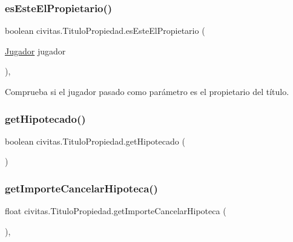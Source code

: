\subsubsection{\texorpdfstring{es\+Este\+El\+Propietario()}{esEsteElPropietario()}}
{\footnotesize\ttfamily boolean civitas.\+Titulo\+Propiedad.\+es\+Este\+El\+Propietario (\begin{DoxyParamCaption}\item[{\hyperlink{classcivitas_1_1Jugador}{Jugador}}]{jugador }\end{DoxyParamCaption})\hspace{0.3cm}{\ttfamily [inline]}, {\ttfamily [private]}}

Comprueba si el jugador pasado como parámetro es el propietario del título. \mbox{\label{classcivitas_1_1TituloPropiedad_a10cc16f629330f82d9fb844c2a1aeac5}} 
\subsubsection{\texorpdfstring{get\+Hipotecado()}{getHipotecado()}}
{\footnotesize\ttfamily boolean civitas.\+Titulo\+Propiedad.\+get\+Hipotecado (\begin{DoxyParamCaption}{ }\end{DoxyParamCaption})\hspace{0.3cm}{\ttfamily [inline]}}

\mbox{\label{classcivitas_1_1TituloPropiedad_a02c54372a15432b602c8a0bfee1a2876}} 
\subsubsection{\texorpdfstring{get\+Importe\+Cancelar\+Hipoteca()}{getImporteCancelarHipoteca()}}
{\footnotesize\ttfamily float civitas.\+Titulo\+Propiedad.\+get\+Importe\+Cancelar\+Hipoteca (\begin{DoxyParamCaption}{ }\end{DoxyParamCaption})\hspace{0.3cm}{\ttfamily [inline]}, {\ttfamily [package]}}

